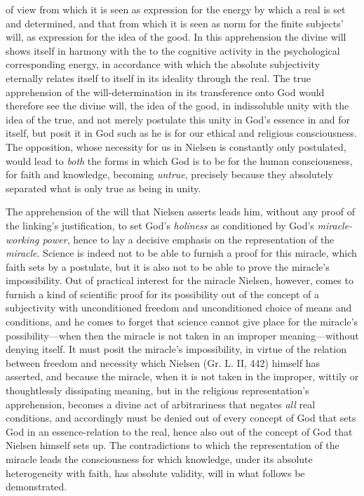 \documentclass[12pt,a4paper]{book}
\begin{document}
of view from which it is seen as expression for the energy by which a real is set and determined, and that
from which it is seen as norm for the finite subjects' will, as expression for the idea of the good. In this
apprehension the divine will shows itself in harmony with the to the cognitive activity in the psychological
corresponding energy, in accordance with which the absolute subjectivity eternally relates itself to itself
in its ideality through the real. The true apprehension of the will-determination in its transference onto God
would therefore see the divine will, the idea of the good, in indissoluble unity with the idea of the true,
and not merely postulate this unity in God's essence in and for itself, but posit it in God such as he is for
our ethical and religious consciousness. The opposition, whose necessity for us in Nielsen is constantly only
postulated, would lead to \emph{both} the forms in which God is to be for the human consciousness, for faith
and knowledge, becoming \emph{untrue}, precisely because they absolutely separated what is only true as being in unity.

The apprehension of the will that Nielsen asserts leads him, without any proof of the linking's justification,
to set God's \emph{holiness} as conditioned by God's \emph{miracle-working power}, hence to lay a decisive
emphasis on the representation of the \emph{miracle}. Science is indeed not to be able to furnish a proof for this
miracle, which faith sets by a postulate, but it is also not to be able to prove the miracle's impossibility.
Out of practical interest for the miracle Nielsen, however, comes to furnish a kind of scientific proof for its
possibility out of the concept of a subjectivity with unconditioned freedom and unconditioned choice of means
and conditions, and he comes to forget that science cannot give place for the miracle's possibility---when then
the miracle is not taken in an improper meaning---without denying itself. It must posit the miracle's
impossibility, in virtue of the relation between freedom and necessity which Nielsen (Gr. L. II, 442) himself
has asserted, and because the miracle, when it is not taken in the improper, wittily or thoughtlessly dissipating
meaning, but in the religious representation's apprehension, becomes a divine act of arbitrariness that negates
\emph{all} real conditions, and accordingly must be denied out of every concept of God that sets God in an
essence-relation to the real, hence also out of the concept of God that Nielsen himself sets up. The
contradictions to which the representation of the miracle leads the consciousness for which knowledge, under its
absolute heterogeneity with faith, has absolute validity, will in what follows be demonstrated.
\end{document}
